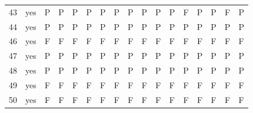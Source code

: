 \begin{table}[p]
\begin{tabular*}{\textwidth}{@{\extracolsep{\fill}}rcccccccccccccccc}
43 & yes & P & P & P & P & P & P & P & P & P & P & F & P & P & F & P\\
44 & yes & P & P & P & P & P & P & P & P & P & P & P & P & P & P & P\\
46 & yes & F & F & F & F & F & F & F & F & F & F & F & F & F & F & F\\
47 & yes & P & P & P & P & P & P & P & P & P & P & P & P & P & P & P\\
48 & yes & P & P & P & P & P & P & P & P & P & P & P & P & P & P & P\\
49 & yes & F & F & F & F & F & F & F & F & F & F & F & F & F & F & F\\
50 & yes & F & F & F & F & F & F & F & F & F & F & F & F & F & F & F\\
\bottomrule\end{tabular*}\end{table}
\clearpage

